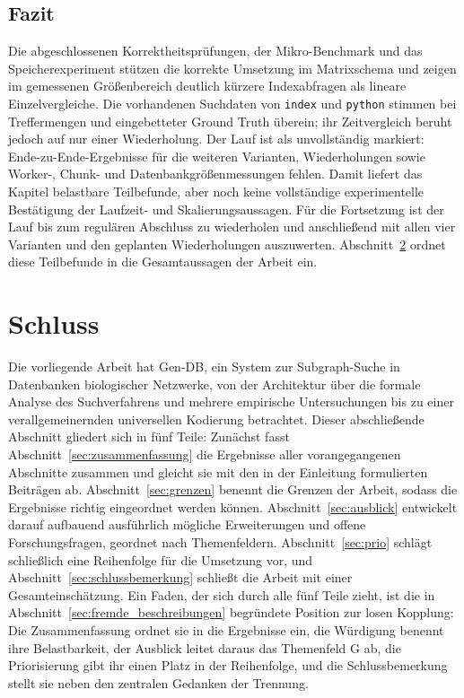 \documentclass[a4paper,12pt, twoside]{report}
\theoremstyle{definition}
\begin{document}
\section{Fazit}
\label{sec:ucx_fazit}

Die abgeschlossenen Korrektheitsprüfungen, der Mikro-Benchmark und das Speicherexperiment stützen die korrekte Umsetzung im Matrixschema und zeigen im gemessenen Größenbereich deutlich kürzere Indexabfragen als lineare Einzelvergleiche. Die vorhandenen Suchdaten von \texttt{index} und \texttt{python} stimmen bei Treffermengen und eingebetteter Ground Truth überein; ihr Zeitvergleich beruht jedoch auf nur einer Wiederholung. Der Lauf ist als unvollständig markiert: Ende-zu-Ende-Ergebnisse für die weiteren Varianten, Wiederholungen sowie Worker-, Chunk- und Datenbankgrößenmessungen fehlen. Damit liefert das Kapitel belastbare Teilbefunde, aber noch keine vollständige experimentelle Bestätigung der Laufzeit- und Skalierungsaussagen. Für die Fortsetzung ist der Lauf bis zum regulären Abschluss zu wiederholen und anschließend mit allen vier Varianten und den geplanten Wiederholungen auszuwerten. Abschnitt~\ref{sec:schluss} ordnet diese Teilbefunde in die Gesamtaussagen der Arbeit ein.

\chapter{Schluss}
\label{sec:schluss}

Die vorliegende Arbeit hat Gen-DB, ein System zur Subgraph-Suche in Datenbanken biologischer Netzwerke, von der Architektur über die formale Analyse des Suchverfahrens und mehrere empirische Untersuchungen bis zu einer verallgemeinernden universellen Kodierung betrachtet. Dieser abschließende Abschnitt gliedert sich in fünf Teile: Zunächst fasst Abschnitt~\ref{sec:zusammenfassung} die Ergebnisse aller vorangegangenen Abschnitte zusammen und gleicht sie mit den in der Einleitung formulierten Beiträgen ab. Abschnitt~\ref{sec:grenzen} benennt die Grenzen der Arbeit, sodass die Ergebnisse richtig eingeordnet werden können. Abschnitt~\ref{sec:ausblick} entwickelt darauf aufbauend ausführlich mögliche Erweiterungen und offene Forschungsfragen, geordnet nach Themenfeldern. Abschnitt~\ref{sec:prio} schlägt schließlich eine Reihenfolge für die Umsetzung vor, und Abschnitt~\ref{sec:schlussbemerkung} schließt die Arbeit mit einer Gesamteinschätzung. Ein Faden, der sich durch alle fünf Teile zieht, ist die in Abschnitt~\ref{sec:fremde_beschreibungen} begründete Position zur losen Kopplung: Die Zusammenfassung ordnet sie in die Ergebnisse ein, die Würdigung benennt ihre Belastbarkeit, der Ausblick leitet daraus das Themenfeld G ab, die Priorisierung gibt ihr einen Platz in der Reihenfolge, und die Schlussbemerkung stellt sie neben den zentralen Gedanken der Trennung.
\end{document}
